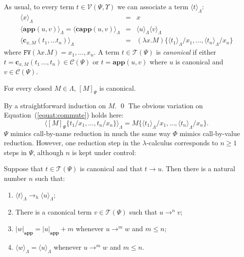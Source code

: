 \documentclass{LMCS}
\newcommand{\varone}{x}
\newcommand{\lambdaone}{M}
\newcommand{\termone}{t}
\newcommand{\termtwo}{u}
\newcommand{\termthree}{v}
\newcommand{\termfour}{w}
\newcommand{\appTRS}{\mathbf{app}}
\newcommand{\cappTRSW}{\mathbf{capp}}
\newcommand{\constr}[2]{\mathbf{c}_{#1,#2}}
\newcommand{\TRSWtolambda}[1]{\langle #1\rangle_{\Lambdaterms}}
\newcommand{\LambdatoTRSW}[1]{[#1]_{\Psi}}
\newcommand{\Variables}{\Upsilon}
\newcommand{\Lambdaterms}{\Lambda}
\newcommand{\TRS}{\Phi}
\newcommand{\TRSW}{\Psi}
\newcommand{\TRSWterms}{\mathcal{T}(\Psi)}
\newcommand{\TRSWvarterms}{\mathcal{V}(\Psi,\Variables)}
\newcommand{\TRSWconterms}{\mathcal{C}(\Psi)}
\newcommand{\rewrTRSW}{\rightarrow}
\newcommand{\rewrlambdah}{\rightarrow_h}
\newcommand{\FV}[1]{\mathtt{FV}(#1)}
\newcommand{\plength}[2]{|#1|_{#2}}
\newcounter{number}
\begin{document}
As usual, to every term $\termone\in\TRSWvarterms$ we can associate a term $\TRSWtolambda{\termone}$:
\begin{eqnarray*}
  \TRSWtolambda{\varone}&=&\varone\\
  \TRSWtolambda{\appTRS(\termtwo,\termthree)}=\TRSWtolambda{\cappTRSW(\termtwo,\termthree)}
     &=&\TRSWtolambda{\termtwo}\TRSWtolambda{\termthree}\\
  \TRSWtolambda{\constr{\varone}{\lambdaone}(\termone_1,\ldots\termone_n)}&=&
  (\lambda\varone.\lambdaone)\{\TRSWtolambda{\termone_1}/\varone_1,\ldots,\TRSWtolambda{\termone_n}/\varone_n\}
\end{eqnarray*}
where $\FV{\lambda\varone.\lambdaone}=\varone_1,\ldots,\varone_n$.
A term $\termone\in\TRSWterms$ is \emph{canonical} if either $\termone=\constr{\varone}{\lambdaone}(\termone_1\,\ldots,\termone_n)\in\TRSWconterms$ or
$\termone=\appTRS(\termtwo,\termthree)$ where $\termtwo$ is canonical and $\termthree\in\TRSWconterms$.
\begin{lem}\label{lemma:closedcanonical}
For every closed $\lambdaone\in\Lambdaterms$, $\LambdatoTRSW{\lambdaone}$ is canonical.
\end{lem}
\proof
By a straightforward induction on $\lambdaone$.
\qed
The obvious variation on Equation~(\ref{equat:commute}) holds here:
\begin{equation}\label{equat:commutew}
\TRSWtolambda{\LambdatoTRSW{\lambdaone}\{\termone_1/\varone_1,\ldots,\termone_n/\varone_n\}}=
\lambdaone\{\TRSWtolambda{\termone_1}/\varone_1,\ldots,\TRSWtolambda{\termone_n}/\varone_n\}.
\end{equation}
$\TRSW$ mimics call-by-name reduction in much the same way $\TRS$ mimics call-by-value
reduction. However, one reduction step in the $\lambda$-calculus corresponds to $n\geq 1$ steps
in $\TRSW$, although $n$ is kept under control:
\begin{lem}\label{lemma:simul}
Suppose that $\termone\in\TRSWterms$ is canonical and that $\termone\rewrTRSW\termtwo$. Then
there is a natural number $n$ such that:
\begin{enumerate}[\em 1.]
\item
  $\TRSWtolambda{\termone}\rewrlambdah\TRSWtolambda{\termtwo}$;
\item
  There is a canonical term $\termthree\in\TRSWterms$ such that $\termtwo\rewrTRSW^n\termthree$;
\item
  $\plength{\termfour}{\appTRS}=\plength{\termtwo}{\appTRS}+m$ whenever $\termtwo\rewrTRSW^m\termfour$
  and $m\leq n$;
\item
  $\TRSWtolambda{\termfour}=\TRSWtolambda{\termtwo}$ whenever $\termtwo\rewrTRSW^m\termfour$
  and $m\leq n$.
\end{enumerate}
\end{lem}
\end{document}
